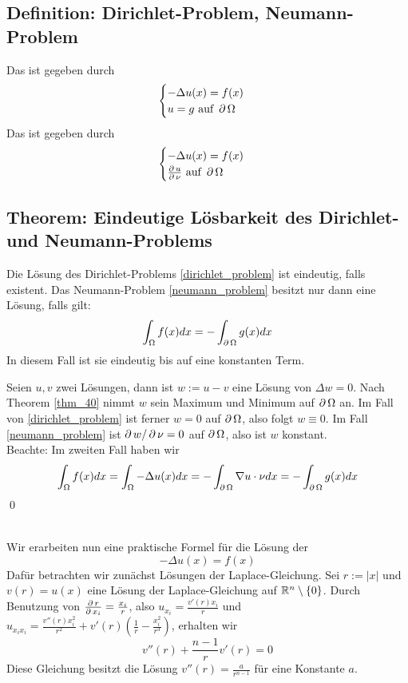 \subsection{Definition: Dirichlet-Problem, Neumann-Problem}
\label{def:dirichlet_neumann}
	Das  ist gegeben durch 
	\begin{equation}
		\begin{cases} -\Delta u(x) = f(x) \\
		u=g \text{ auf } \operatorname{\partial} \Omega \end{cases} \label{dirichlet_problem}
	\end{equation}
	Das  ist gegeben durch
	\begin{equation}
		\begin{cases} -\Delta u(x) = f(x) \\
		\frac{\operatorname{\partial} u}{\operatorname{\partial} \nu} \text{ auf } \operatorname{\partial} \Omega \end{cases} \label{neumann_problem}
	\end{equation}
	
\subsection{Theorem: Eindeutige Lösbarkeit des Dirichlet- und Neumann-Problems}
\label{thm_43}
	Die Lösung des Dirichlet-Problems \eqref{dirichlet_problem} ist eindeutig, \marginnote{[43]} falls existent. Das Neumann-Problem \eqref{neumann_problem} besitzt nur dann eine Lösung, falls gilt:
	\[ \int_\Omega f(x) dx = - \int_{\operatorname{\partial} \Omega} g(x) dx \]
	In diesem Fall ist sie eindeutig bis auf eine konstanten Term.
	
	Seien $u, v$ zwei Lösungen, dann ist $w := u-v$ eine Lösung von $\Delta w = 0$. Nach Theorem \ref{thm_40} nimmt $w$ sein Maximum und Minimum auf $\operatorname{\partial} \Omega$ an. Im Fall von \eqref{dirichlet_problem} ist ferner $w = 0$ auf $\operatorname{\partial} \Omega$, also folgt $w \equiv 0$. Im Fall \eqref{neumann_problem} ist $\operatorname{\partial} w / \operatorname{\partial} \nu = 0$ auf $\operatorname{\partial} \Omega$, also ist $w$ konstant. \\
	Beachte: Im zweiten Fall haben wir
	\[ \int_{\Omega} f(x) dx = \int_\Omega - \Delta u(x) dx = -\int_{\operatorname{\partial} \Omega} \nabla u \cdot \nu dx = - \int_{\operatorname{\partial} \Omega} g(x) dx\]
	\qed
	
\mbox{} \\
Wir erarbeiten nun eine praktische Formel für die Lösung der 
\begin{equation}
	-\Delta u(x) = f(x) \label{poissongl}
\end{equation}
Dafür betrachten wir zunächst Lösungen der Laplace-Gleichung. Sei $r := |x|$ und $v(r) = u(x)$ eine Lösung der Laplace-Gleichung auf $\mathbb{R}^n \setminus \{0\}$. Durch Benutzung von $\frac{\operatorname{\partial} r}{\operatorname{\partial} x_i} = \frac{x_i}{r}$, also $u_{x_i} = \frac{v'(r) x_i}{r}$ und $u_{x_ix_i} = \frac{v''(r)x_i^2}{r^2} + v'(r) \left( \frac{1}{r}-\frac{x_i^2}{r^3} \right)$, erhalten wir
\[ v''(r) + \frac{n-1}{r} v'(r) = 0 \]
Diese Gleichung besitzt die Lösung $v''(r) = \frac{a}{r^{n-1}}$ für eine Konstante $a$.

